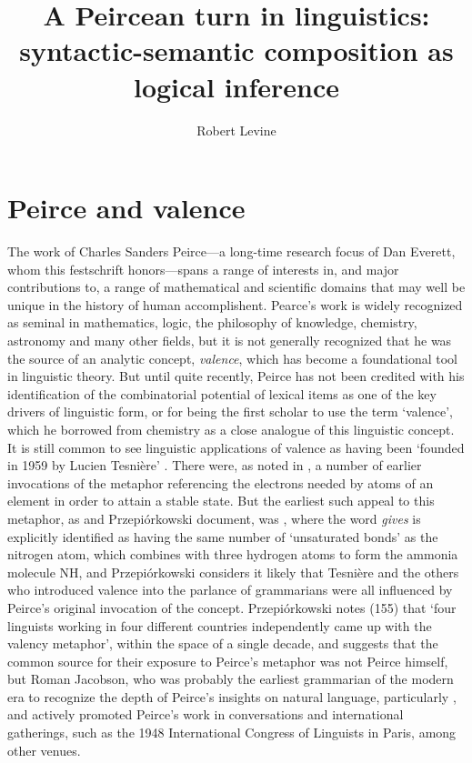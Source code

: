 \documentclass[output=paper,colorlinks,citecolor=brown]{langscibook}
\title{A Peircean turn in linguistics: syntactic-semantic composition as logical inference}
\author{Robert Levine\affiliation{Ohio State University}}
\begin{document}
\maketitle
\providecommand{\SetInfLen}{\relax}




\section{Peirce and valence}

The work of Charles Sanders Peirce---a long-time research focus of Dan
Everett, whom this festschrift honors---spans a range of interests in,
and major contributions to, a range of mathematical and scientific
domains that may well be unique in the history of human
accomplishent. Pearce's work is widely recognized as seminal in
mathematics, logic, the philosophy of knowledge, chemistry, astronomy
and many other fields, but it is not generally recognized that he was
the source of an analytic concept, \textsl{valence}, which has become
a foundational tool in linguistic theory. But until quite recently,
Peirce has not been credited with his identification of the
combinatorial potential of lexical items as one of the key drivers of
linguistic form, or for being the first scholar to use the term
`valence', which he borrowed from chemistry as a close analogue of
this linguistic concept. It is still common to see linguistic
applications of valence as having been `founded in 1959 by Lucien
Tesnière' \citet{hollein2022}. There were, as noted in \citet{AdamP-Peirce}, a
number of earlier invocations of the metaphor referencing the
electrons needed by atoms of an element in order to attain a stable
state. But the earliest such appeal to this metaphor, as \citet{askedal91}
and Przepi\'{o}rkowski document, was \citet{peirce1897}, where the word
\textit{gives} is explicitly identified as having the same number of
`unsaturated bonds' as the nitrogen atom, which combines with three
hydrogen atoms to form the ammonia molecule NH, and
Przepi{\'o}rkowski considers it likely that Tesnière and the
others who introduced valence into the parlance of grammarians were
all influenced by Peirce's original invocation of the
concept. Przepi{\'o}rkowski notes (155) that `four linguists working
in four different countries independently came up with the valency
metaphor', within the space of a single decade, and suggests that the
common source for their exposure to Peirce's metaphor was not Peirce
himself, but Roman Jacobson, who was probably the earliest
grammarian of the modern era to recognize the depth of Peirce's
insights on natural language, particularly \citet{peirce1897}, and actively
promoted Peirce's work in conversations and international gatherings,
such as the 1948 International Congress of Linguists in Paris, among
other venues.
\end{document}
